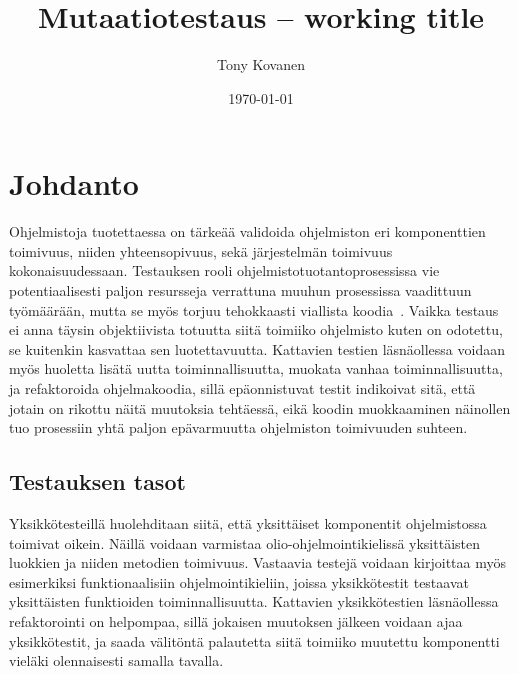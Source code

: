 \documentclass{tktltiki}
\begin{document}
\onehalfspacing

\title{Mutaatiotestaus -- working title}
\author{Tony Kovanen}
\date{\today}

\maketitle



\mytableofcontents

\section{Johdanto}
Ohjelmistoja tuotettaessa on tärkeää validoida ohjelmiston eri komponenttien toimivuus, niiden yhteensopivuus, sekä järjestelmän toimivuus kokonaisuudessaan. Testauksen rooli ohjelmistotuotantoprosessissa vie potentiaalisesti paljon resursseja verrattuna muuhun prosessissa vaadittuun työmäärään, mutta se myös torjuu tehokkaasti viallista koodia~\cite{}. Vaikka testaus ei anna täysin objektiivista totuutta siitä toimiiko ohjelmisto kuten on odotettu, se kuitenkin kasvattaa sen luotettavuutta. Kattavien testien läsnäollessa voidaan myös huoletta lisätä uutta toiminnallisuutta, muokata vanhaa toiminnallisuutta, ja refaktoroida ohjelmakoodia, sillä epäonnistuvat testit indikoivat sitä, että jotain on rikottu näitä muutoksia tehtäessä, eikä koodin muokkaaminen näinollen tuo prosessiin yhtä paljon epävarmuutta ohjelmiston toimivuuden suhteen.

\subsection{Testauksen tasot}
Yksikkötesteillä huolehditaan siitä, että yksittäiset komponentit ohjelmistossa toimivat oikein. Näillä voidaan varmistaa olio-ohjelmointikielissä yksittäisten luokkien ja niiden metodien toimivuus. Vastaavia testejä voidaan kirjoittaa myös esimerkiksi funktionaalisiin ohjelmointikieliin, joissa yksikkötestit testaavat yksittäisten funktioiden toiminnallisuutta. Kattavien yksikkötestien läsnäollessa refaktorointi on helpompaa, sillä jokaisen muutoksen jälkeen voidaan ajaa yksikkötestit, ja saada välitöntä palautetta siitä toimiiko muutettu komponentti vieläki olennaisesti samalla tavalla.
\end{document}
